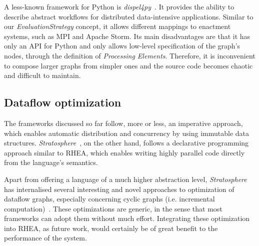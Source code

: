 \documentclass[sigplan,screen]{acmart}
\begin{document}
A less-known framework for Python is
\textit{dispel4py}~\cite{dispel4py}. It provides the ability
to describe abstract workflows for distributed data-intensive applications.
Similar to our \textit{EvaluationStrategy} concept, it allows different mappings
to enactment systems, such as MPI and Apache Storm.
Its main disadvantages are that it has only an API for Python and only allows
low-level specification of the graph's nodes, through the definition of
\textit{Processing Elements}. Therefore, it is inconvenient to compose larger
graphs from simpler ones and the source code becomes chaotic and difficult to
maintain.

\subsection{Dataflow optimization}
The frameworks discussed so far follow, more or less, an imperative approach,
which enables automatic distribution and concurrency by using immutable data
structures. \textit{Stratosphere}~\cite{stratosphere}, on the other hand, follows
a declarative programming approach similar to \textsc{RHEA}, which enables
writing highly parallel code directly from the language's semantics.

Apart from offering a language of a much higher abstraction level,
\textit{Stratosphere} has internalised several interesting and novel approaches
to optimization of dataflow graphs, especially concerning cyclic graphs (i.e.
incremental computation)~\cite{spinning}. These optimizations are generic, in the
sense that most frameworks can adopt them without much effort. Integrating these
optimization into \textsc{RHEA}, as future work, would certainly be of great
benefit to the performance of the system.
\end{document}
